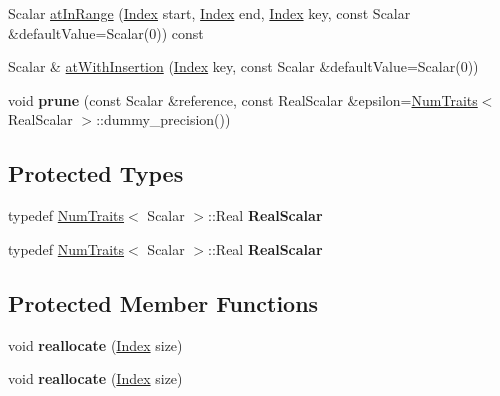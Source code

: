 \begin{DoxyCompactItemize}
\item 
Scalar \hyperlink{class_eigen_1_1internal_1_1_compressed_storage_a70c2745dd270aaa44b415ec2e9bf2ae0}{at\+In\+Range} (\hyperlink{namespace_eigen_a62e77e0933482dafde8fe197d9a2cfde}{Index} start, \hyperlink{namespace_eigen_a62e77e0933482dafde8fe197d9a2cfde}{Index} end, \hyperlink{namespace_eigen_a62e77e0933482dafde8fe197d9a2cfde}{Index} key, const Scalar \&default\+Value=Scalar(0)) const
\item 
Scalar \& \hyperlink{class_eigen_1_1internal_1_1_compressed_storage_a8621aa0d1d0e27b025d41b9321968357}{at\+With\+Insertion} (\hyperlink{namespace_eigen_a62e77e0933482dafde8fe197d9a2cfde}{Index} key, const Scalar \&default\+Value=Scalar(0))
\item 
\mbox{\label{class_eigen_1_1internal_1_1_compressed_storage_ab82e42c20bd4522475aec0dd61835259}} 
void {\bfseries prune} (const Scalar \&reference, const Real\+Scalar \&epsilon=\hyperlink{group___core___module_struct_eigen_1_1_num_traits}{Num\+Traits}$<$ Real\+Scalar $>$\+::dummy\+\_\+precision())
\end{DoxyCompactItemize}
\subsection*{Protected Types}
\begin{DoxyCompactItemize}
\item 
\mbox{\label{class_eigen_1_1internal_1_1_compressed_storage_ac74d44c0ee51ef7b98d274c6a10fbf93}} 
typedef \hyperlink{group___core___module_struct_eigen_1_1_num_traits}{Num\+Traits}$<$ Scalar $>$\+::Real {\bfseries Real\+Scalar}
\item 
\mbox{\label{class_eigen_1_1internal_1_1_compressed_storage_ac74d44c0ee51ef7b98d274c6a10fbf93}} 
typedef \hyperlink{group___core___module_struct_eigen_1_1_num_traits}{Num\+Traits}$<$ Scalar $>$\+::Real {\bfseries Real\+Scalar}
\end{DoxyCompactItemize}
\subsection*{Protected Member Functions}
\begin{DoxyCompactItemize}
\item 
\mbox{\label{class_eigen_1_1internal_1_1_compressed_storage_ad9e41dc861c361ecc304fcff83da9ecd}} 
void {\bfseries reallocate} (\hyperlink{namespace_eigen_a62e77e0933482dafde8fe197d9a2cfde}{Index} size)
\item 
\mbox{\label{class_eigen_1_1internal_1_1_compressed_storage_ad9e41dc861c361ecc304fcff83da9ecd}} 
void {\bfseries reallocate} (\hyperlink{namespace_eigen_a62e77e0933482dafde8fe197d9a2cfde}{Index} size)
\end{DoxyCompactItemize}
